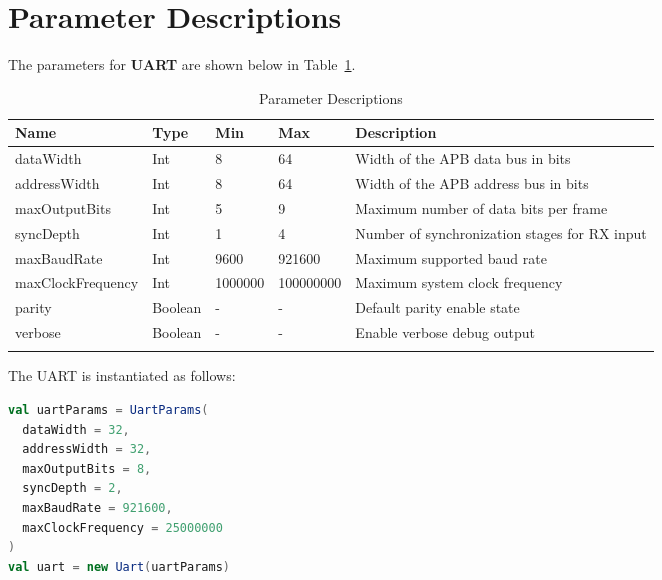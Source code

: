 \section{Parameter Descriptions}
The parameters for \textbf{UART} are shown below in Table~\ref{table:params}.

\renewcommand*{\arraystretch}{1.4}
\begin{longtable}[H]{
    | p{}
    | p{}
    | p{}
    | p{}
    | p{} |
  }
  \hline
  \textbf{Name} &
  \textbf{Type} &
  \textbf{Min}  &
  \textbf{Max}  &
  \textbf{Description}            \\ \hline \hline
  dataWidth &
  Int &
  8 &
  64 &
  Width of the APB data bus in bits \\ \hline
  addressWidth &
  Int &
  8 &
  64 &
  Width of the APB address bus in bits \\ \hline
  maxOutputBits &
  Int &
  5 &
  9 &
  Maximum number of data bits per frame \\ \hline
  syncDepth &
  Int &
  1 &
  4 &
  Number of synchronization stages for RX input \\ \hline
  maxBaudRate &
  Int &
  9600 &
  921600 &
  Maximum supported baud rate \\ \hline
  maxClockFrequency &
  Int &
  1000000 &
  100000000 &
  Maximum system clock frequency \\ \hline
  parity &
  Boolean &
  - &
  - &
  Default parity enable state \\ \hline
  verbose &
  Boolean &
  - &
  - &
  Enable verbose debug output \\ \hline
  
  \caption{Parameter Descriptions}\label{table:params}
\end{longtable}

The UART is instantiated as follows:
\begin{lstlisting}[language=Scala]
val uartParams = UartParams(
  dataWidth = 32,
  addressWidth = 32,
  maxOutputBits = 8,
  syncDepth = 2,
  maxBaudRate = 921600,
  maxClockFrequency = 25000000
)
val uart = new Uart(uartParams)
\end{lstlisting}